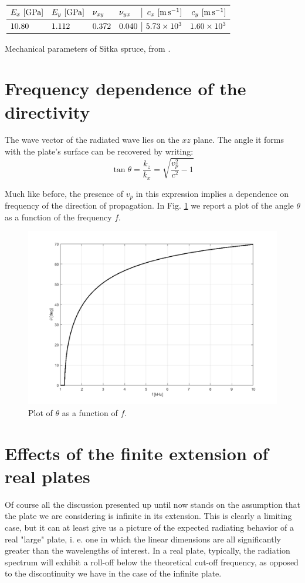 \documentclass[a4paper]{article}
\begin{document}
\begin{table}[h]
	\centering
	$\begin{array}{llll|rr}
		\toprule
		E_x~[\si{\giga\pascal]}& E_y~[\si{\giga\pascal}] & \nu_{xy} & \nu_{yx} & c_x~[\si{\meter\per\second}] &  c_y~[\si{\meter\per\second}]\\
		\midrule
		10.80 & 1.112 & 0.372 & 0.040 & 5.73\times10^3 & 1.60\times10^3\\
		\bottomrule
	\end{array}$
	\caption{Mechanical parameters of Sitka spruce, from \cite{wood}.}
	\label{tab:wood}
\end{table}

\section{Frequency dependence of the directivity}

The wave vector of the radiated wave lies on the $xz$ plane. The angle it forms with the plate's surface can be recovered by writing:
$$ \tan \theta = \frac{k_z}{k_x} = \sqrt{\frac{v_p^2}{c^2} - 1} $$

Much like before, the presence of $v_p$ in this expression implies a dependence on frequency of the direction of propagation. In Fig. \ref{fig:dir} we report a plot of the angle $\theta$ as a function of the frequency $f$.

\begin{figure}[h]
	\centering
	\includegraphics[width=0.8\linewidth]{lindir.png}
	\caption{Plot of $\theta$ as a function of $f$.}
	\label{fig:dir}
\end{figure}


\section{Effects of the finite extension of real plates}

Of course all the discussion presented up until now stands on the assumption that the plate we are considering is infinite in its extension. This is clearly a limiting case, but it can at least give us a picture of the expected radiating behavior of a real "large" plate, i. e. one in which the linear dimensions are all significantly greater than the wavelengths of interest. In a real plate, typically, the radiation spectrum will exhibit a roll-off below the theoretical cut-off frequency, as opposed to the discontinuity we have in the case of the infinite plate.

\printbibliography
\end{document}
